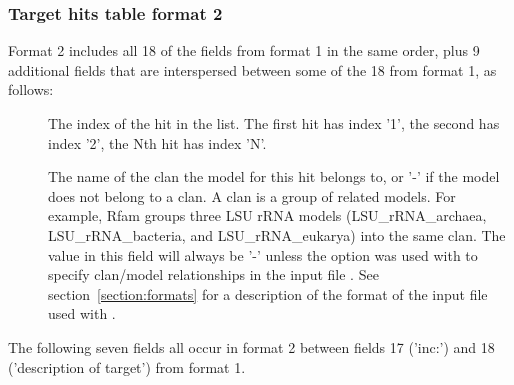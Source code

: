 \subsubsection{Target hits table format 2}

Format 2 includes all 18 of the fields from format 1 in the same order, plus 9
additional fields that are interspersed between some of the 18 from
format 1, as follows:

\begin{description}

\item[] 
  The index of the hit in the list. The first hit has index '1', the
  second has index '2', the Nth hit has index 'N'.

\item[] 
  The name of the clan the model for this hit belongs to, or '-' if
  the model does not belong to a clan. A clan is a group of related
  models. For example, Rfam groups three LSU rRNA models
  (LSU\_rRNA\_archaea, LSU\_rRNA\_bacteria, and LSU\_rRNA\_eukarya)
  into the same clan. The value in this field will always be '-'
  unless the  option was used with
   to specify clan/model relationships in the input file
  . See section~\ref{section:formats} for a description of
  the format of the input file used with .

\end{description}

The following seven fields all occur in format 2 between fields 17
('inc:') and 18 ('description of target') from format 1. 

